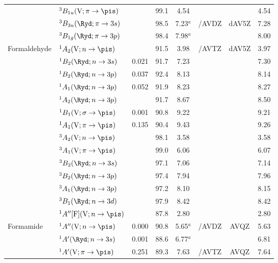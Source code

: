 \begin{tabular}{llcccccc}
        &$^3B_{1u} (\mathrm{V};\pi \rightarrow \pis)$ 				&		&99.1 &4.54		& 			&			&4.54	\\
        &$^3B_{3u} (\Ryd;\pi \rightarrow 3s)$ 					&		&98.5 &7.23$^a$	&{\exCI}/AVDZ& dAV5Z		&7.28	\\
        &$^3B_{1g} (\Ryd;\pi \rightarrow 3p)$ 					&		&98.4 &7.98$^a$	&			&			&8.00	\\
  Formaldehyde	&$^1A_2 (\mathrm{V}; n \rightarrow \pis)$ 				&		&91.5 &3.98		&{\exCI}/AVTZ & dAV5Z		&3.97	\\
        &$^1B_2 (\Ryd;n \rightarrow 3s)$ 						& 0.021	&91.7 &7.23		&			 &			&7.30	\\
        &$^1B_2 (\Ryd;n \rightarrow 3p)$ 						& 0.037	&92.4 &8.13		&			&			&8.14	\\
        &$^1A_1 (\Ryd;n \rightarrow 3p)$ 						& 0.052	&91.9 &8.23		&			&			&8.27	\\
        &$^1A_2 (\Ryd;n \rightarrow 3p)$ 						&		&91.7 &8.67		&			&			&8.50	\\
        &$^1B_1 (\mathrm{V};\sigma \rightarrow \pis)$				& 0.001	&90.8 &9.22		&			&			&9.21	\\
        &$^1A_1 (\mathrm{V};\pi \rightarrow \pis)$				& 0.135	&90.4 &9.43		&			&			&9.26	\\
        &$^3A_2 (\mathrm{V};n \rightarrow \pis)$ 					&		&98.1 &3.58		&			&			&3.58	\\
        &$^3A_1 (\mathrm{V};\pi \rightarrow \pis)$				&		&99.0 &6.06		&			&			&6.07	\\
        &$^3B_2 (\Ryd;n \rightarrow 3s)$ 						&		&97.1 &7.06		&			&			&7.14	\\
        &$^3B_2 (\Ryd;n \rightarrow 3p)$ 						&		&97.4 &7.94		&			&			&7.96	\\
        &$^3A_1 (\Ryd;n \rightarrow 3p)$ 						&		&97.2 &8.10		&			&			&8.15	\\
        &$^3B_1 (\Ryd;n \rightarrow 3d)$ 						&		&97.9 &8.42		&			&			&8.42	\\
        &$^1A'' [\mathrm{F}] (\mathrm{V};n \rightarrow \pis)$			&		&87.8 &2.80		&			&			&2.80	\\
  Formamide	&$^1A'' (\mathrm{V};n \rightarrow \pis)$					&0.000	&90.8 &5.65$^a$	&{\exCI}/AVDZ& AVQZ		&5.63	\\
        &$^1A' (\Ryd;n \rightarrow 3s)$							&0.001	&88.6 &6.77$^a$	&			&			&6.81	\\
        &$^1A' (\mathrm{V};\pi \rightarrow \pis)$					&0.251	&89.3 &7.63		&{\exCI}/AVTZ & AVQZ		&7.64	\\

\end{tabular}
